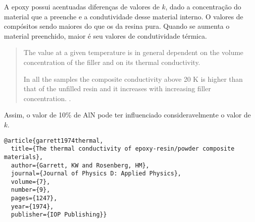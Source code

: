 \documentclass[11pt]{article}
\begin{document}
A epoxy possui acentuadas diferenças de valores de \(k\), dado a concentração do material que a preenche e a condutividade desse material interno. O valores de compósitos sendo maiores do que os da resina pura. Quando se aumenta o material preenchido, maior é seu valores de condutividade térmica.

\begin{quote}
The value at a given temperature is in general dependent on the volume concentration of the filler and on its thermal conductivity. 

In all the samples the composite conductivity above 20 K is higher than that of the unfilled resin and it increases with increasing filler concentration. \cite{garrett1974thermal}.
\end{quote}

Assim, o valor de 10\% de AlN pode ter influenciado consideravelmente o valor de \(k\).

\begin{verbatim}
@article{garrett1974thermal,
  title={The thermal conductivity of epoxy-resin/powder composite materials},
  author={Garrett, KW and Rosenberg, HM},
  journal={Journal of Physics D: Applied Physics},
  volume={7},
  number={9},
  pages={1247},
  year={1974},
  publisher={IOP Publishing}}
\end{verbatim}
\end{document}
